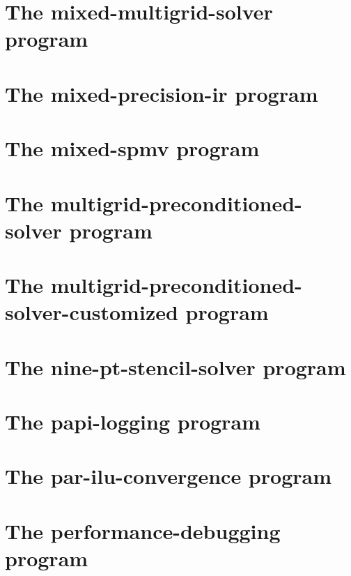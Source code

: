\let\mypdfximage\pdfximage\def\pdfximage{\immediate\mypdfximage}\documentclass[twoside]{book}
\newcommand{\+}{\discretionary{\mbox{\scriptsize$\hookleftarrow$}}{}{}}
\begin{document}
\chapter{The mixed-\/multigrid-\/solver program}
\label{mixed_multigrid_solver}

\chapter{The mixed-\/precision-\/ir program}
\label{mixed_precision_ir}

\chapter{The mixed-\/spmv program}
\label{mixed_spmv}

\chapter{The multigrid-\/preconditioned-\/solver program}
\label{multigrid_preconditioned_solver}

\chapter{The multigrid-\/preconditioned-\/solver-\/customized program}
\label{multigrid_preconditioned_solver_customized}

\chapter{The nine-\/pt-\/stencil-\/solver program}
\label{nine_pt_stencil_solver}

\chapter{The papi-\/logging program}
\label{papi_logging}

\chapter{The par-\/ilu-\/convergence program}
\label{par_ilu_convergence}

\chapter{The performance-\/debugging program}
\label{performance_debugging}

\end{document}
